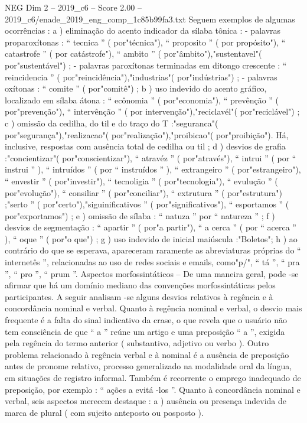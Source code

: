 \begin{textsample}{NEG Dim 2 – 2019\_c6 – Score 2.00 – 2019\_c6/enade\_2019\_eng\_comp\_1c85b99fa3.txt}
Seguem exemplos de algumas ocorrências : a ) eliminação do acento indicador da sílaba tônica : - palavras proparoxítonas : “ tecnica ” ( por"técnica"), “ proposito ” ( por propósito"), “ catastrofe ” ( por catástrofe"), “ ambito ” ( por"âmbito"),"sustentavel"( por"sustentável") ; - palavras paroxítonas terminadas em ditongo crescente : “ reincidencia ” ( por"reincidência"),"industrias"( por"indústrias") ; - palavras oxítonas : “ comite ” ( por"comitê") ; b ) uso indevido do acento gráfico, localizado em sílaba átona : “ ecônomia ” ( por"economia"), “ prevênção ” ( por"prevenção"), “ intervênção ” ( por intervenção"),"reciclavél"( por"reciclável") ; c ) omissão da cedilha, do til e do traço do T :"seguranca"( por"segurança"),"realizacao"( por"realização"),"proibicao"( por"proibição").
Há, inclusive, respostas com ausência total de cedilha ou til ; d ) desvios de grafia :"concientizar"( por"conscientizar"), “ atravéz ” ( por"através"), “ intrui ” ( por “ instrui ” ), “ intruídos ” ( por “ instruídos ” ), “ extrangeiro ” ( por"estrangeiro"), “ envestir ” ( por"investir"), “ tecnoligia ” ( por"tecnologia"), “ evulução ” ( por"evolução"), “ consiliar ” ( por"conciliar"), “ extrutura ” ( por"estrutura") ;"serto ” ( por"certo"),"siguinificativos ” ( por"significativos"), “ esportamos ” ( por"exportamos") ; e ) omissão de sílaba : “ natuza ” por “ natureza ” ; f ) desvios de segmentação : “ apartir ” ( por"a partir"), “ a cerca ” ( por “ acerca ” ), “ oque ” ( por"o que") ; g ) uso indevido de inicial maiúscula :"Boletos"; h ) ao contrário do que se esperava, apareceram raramente as abreviaturas próprias do “ internetês ”, relacionadas ao uso de redes sociais e emails, como"p/", “ tá ”, “ pra ”, “ pro ”, “ prum ”.
Aspectos morfossintáticos – De uma maneira geral, pode -se afirmar que há um domínio mediano das convenções morfossintáticas pelos participantes.
A seguir analisam -se alguns desvios relativos à regência e à concordância nominal e verbal.
Quanto à regência nominal e verbal, o desvio mais frequente é a falta do sinal indicativo da crase, o que revela que o usuário não tem consciência de que “ a ” reúne um artigo e uma preposição “ a ”, exigida pela regência do termo anterior ( substantivo, adjetivo ou verbo ).
Outro problema relacionado à regência verbal e à nominal é a ausência de preposição antes de pronome relativo, processo generalizado na modalidade oral da língua, em situações de registro informal.
Também é recorrente o emprego inadequado de preposição, por exemplo : “ ações a evitá -los ”.
Quanto à concordância nominal e verbal, seis aspectos merecem destaque : a ) ausência ou presença indevida de marca de plural ( com sujeito anteposto ou posposto ).

\end{textsample}

